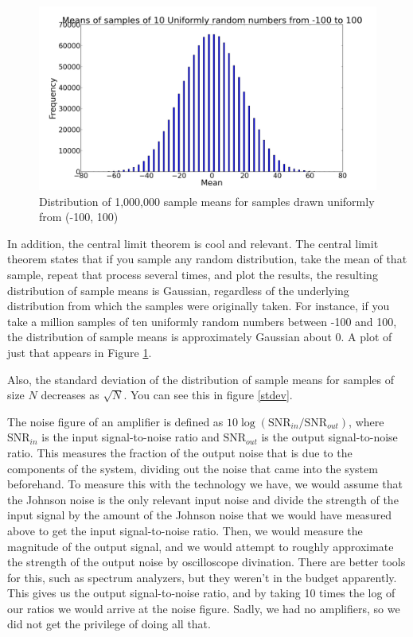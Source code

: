 \documentclass[11pt]{article}
\newcommand{\snrin}{\text{SNR}_{in}}
\newcommand{\snrout}{\text{SNR}_{out}}
\begin{document}
\begin{figure}
\includegraphics[scale=0.4]{centralimit}
\caption{Distribution of 1,000,000 sample means for samples drawn uniformly from (-100, 100) \label{centralimit}}
\end{figure}

In addition, the central limit theorem is cool and relevant. The central limit theorem states that if you sample any random distribution, 
take the mean of that sample, repeat that process several times, and plot the results, the resulting distribution of sample means is 
Gaussian, regardless of the underlying distribution from which the samples were originally taken. For instance, if you take a million
samples of ten uniformly random numbers between -100 and 100, the distribution of sample means is approximately Gaussian about 0. A
plot of just that appears in Figure \ref{centralimit}.

Also, the standard deviation of the distribution of sample means for samples of size $N$ decreases as $\sqrt{N}$. You can see this
in figure \ref{stdev}.

The noise figure of an amplifier is defined as $10\log{(\snrin/\snrout)}$, where $\snrin$ is the input signal-to-noise ratio and
$\snrout$ is the output signal-to-noise ratio. This measures the fraction of the output noise that is due to the components of 
the system, dividing out the noise that came into the system beforehand. To measure this with the technology we have, we would assume
that the Johnson noise is the only relevant input noise and divide the strength of the input signal by the amount of the
Johnson noise that we would have measured above to get the input signal-to-noise ratio. Then, we would measure the magnitude of the
output signal, and we would attempt to roughly approximate the strength of the output noise by oscilloscope divination. There are better 
tools for this, such as spectrum analyzers, but they weren't in the budget apparently. This gives us the output signal-to-noise
ratio, and by taking 10 times the log of our ratios we would arrive at the noise figure. Sadly, we had no amplifiers, so we did
not get the privilege of doing all that.
\end{document}
